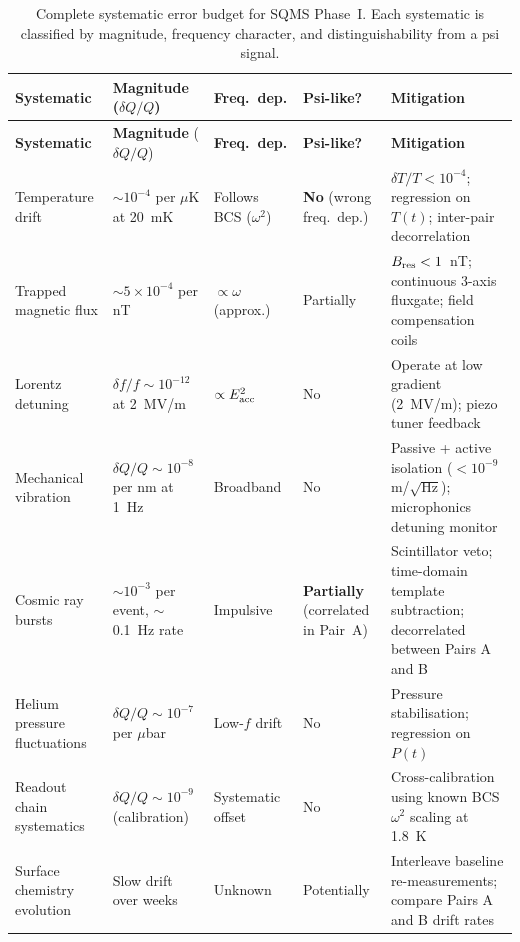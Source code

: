 \documentclass[11pt]{article}
\newcommand{\ee}[1]{\times 10^{#1}}
\begin{document}
\begin{longtable}{@{}p{2.8cm}p{2.5cm}p{2cm}p{2.5cm}p{3cm}@{}}
\caption{Complete systematic error budget for SQMS Phase~I. Each
systematic is classified by magnitude, frequency character, and
distinguishability from a psi signal.}
\label{tab:systematics}\\
\toprule
\textbf{Systematic} & \textbf{Magnitude} ($\delta Q/Q$) &
  \textbf{Freq.\ dep.} & \textbf{Psi-like?} &
  \textbf{Mitigation} \\
\midrule
\endfirsthead
\toprule
\textbf{Systematic} & \textbf{Magnitude} ($\delta Q/Q$) &
  \textbf{Freq.\ dep.} & \textbf{Psi-like?} &
  \textbf{Mitigation} \\
\midrule
\endhead
\bottomrule
\endlastfoot
%
Temperature drift &
  $\sim 10^{-4}$ per $\mu$K at 20~mK &
  Follows BCS ($\omega^2$) &
  \textbf{No} (wrong freq.\ dep.) &
  $\delta T/T < 10^{-4}$; regression on $T(t)$; inter-pair decorrelation \\
\midrule
Trapped magnetic flux &
  $\sim 5\ee{-4}$ per nT &
  $\propto \omega$ (approx.) &
  Partially &
  $B_{\rm res} < 1$~nT; continuous 3-axis fluxgate; field compensation coils \\
\midrule
Lorentz detuning &
  $\delta f/f \sim 10^{-12}$ at 2~MV/m &
  $\propto E_{\rm acc}^2$ &
  No &
  Operate at low gradient (2~MV/m); piezo tuner feedback \\
\midrule
Mechanical vibration &
  $\delta Q/Q \sim 10^{-8}$ per nm at 1~Hz &
  Broadband &
  No &
  Passive + active isolation ($<10^{-9}$ m/$\sqrt{\text{Hz}}$);
  microphonics detuning monitor \\
\midrule
Cosmic ray bursts &
  $\sim 10^{-3}$ per event, $\sim$0.1~Hz rate &
  Impulsive &
  \textbf{Partially} (correlated in Pair~A) &
  Scintillator veto; time-domain template subtraction; decorrelated between
  Pairs A and B \\
\midrule
Helium pressure fluctuations &
  $\delta Q/Q \sim 10^{-7}$ per $\mu$bar &
  Low-$f$ drift &
  No &
  Pressure stabilisation; regression on $P(t)$ \\
\midrule
Readout chain systematics &
  $\delta Q/Q \sim 10^{-9}$ (calibration) &
  Systematic offset &
  No &
  Cross-calibration using known BCS $\omega^2$ scaling at 1.8~K \\
\midrule
Surface chemistry evolution &
  Slow drift over weeks &
  Unknown &
  Potentially &
  Interleave baseline re-measurements; compare Pairs A and B drift
  rates \\
\bottomrule
\end{longtable}
\end{document}
